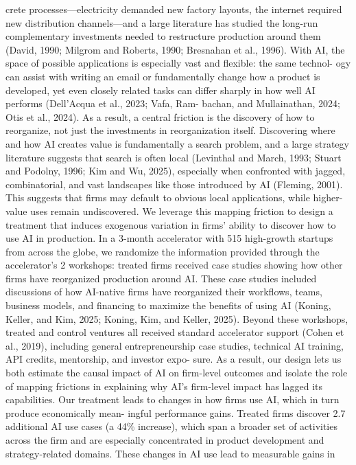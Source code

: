 crete processes—electricity demanded new factory layouts, the internet required new distribution
channels—and a large literature has studied the long-run complementary investments needed to
restructure production around them (David, 1990; Milgrom and Roberts, 1990; Bresnahan et al.,
1996). With AI, the space of possible applications is especially vast and flexible: the same technol-
ogy can assist with writing an email or fundamentally change how a product is developed, yet even
closely related tasks can differ sharply in how well AI performs (Dell’Acqua et al., 2023; Vafa, Ram-
bachan, and Mullainathan, 2024; Otis et al., 2024). As a result, a central friction is the discovery
of how to reorganize, not just the investments in reorganization itself. Discovering where and how
AI creates value is fundamentally a search problem, and a large strategy literature suggests that
search is often local (Levinthal and March, 1993; Stuart and Podolny, 1996; Kim and Wu, 2025),
especially when confronted with jagged, combinatorial, and vast landscapes like those introduced
by AI (Fleming, 2001). This suggests that firms may default to obvious local applications, while
higher-value uses remain undiscovered.
We leverage this mapping friction to design a treatment that induces exogenous variation in
firms’ ability to discover how to use AI in production. In a 3-month accelerator with 515 high-growth
startups from across the globe, we randomize the information provided through the accelerator’s
2
workshops: treated firms received case studies showing how other firms have reorganized production
around AI. These case studies included discussions of how AI-native firms have reorganized their
workflows, teams, business models, and financing to maximize the benefits of using AI (Koning,
Keller, and Kim, 2025; Koning, Kim, and Keller, 2025).
Beyond these workshops, treated and
control ventures all received standard accelerator support (Cohen et al., 2019), including general
entrepreneurship case studies, technical AI training, API credits, mentorship, and investor expo-
sure. As a result, our design lets us both estimate the causal impact of AI on firm-level outcomes
and isolate the role of mapping frictions in explaining why AI’s firm-level impact has lagged its
capabilities.
Our treatment leads to changes in how firms use AI, which in turn produce economically mean-
ingful performance gains.
Treated firms discover 2.7 additional AI use cases (a 44\% increase),
which span a broader set of activities across the firm and are especially concentrated in product
development and strategy-related domains. These changes in AI use lead to measurable gains in
